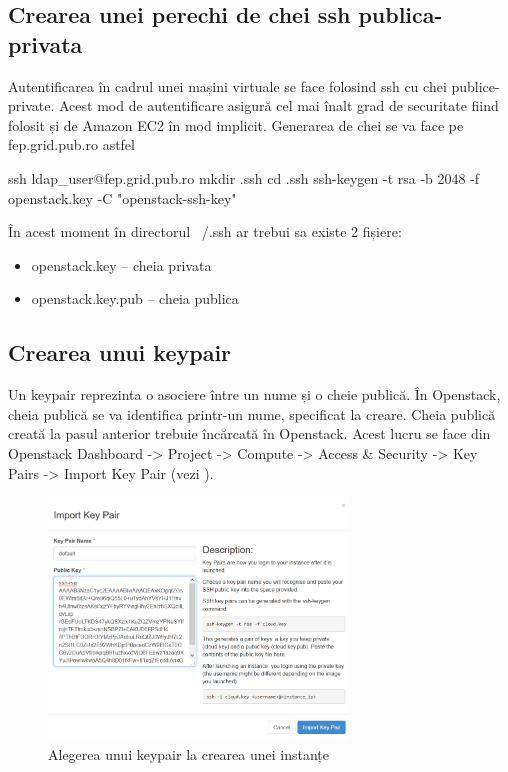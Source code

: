 \subsection{Crearea unei perechi de chei ssh publica-privata}
\label{sec:vm-openstack-keys}

Autentificarea în cadrul unei mașini virtuale se face folosind ssh cu chei
publice-private. Acest mod de autentificare asigură cel mai înalt grad de
securitate fiind folosit și de Amazon EC2 în mod implicit. Generarea de chei se
va face pe fep.grid.pub.ro astfel

\begin{screen}
ssh ldap_user@fep.grid.pub.ro
mkdir .ssh
cd .ssh
ssh-keygen -t rsa -b 2048 -f openstack.key -C "openstack-ssh-key"
\end{screen}

În acest moment în directorul ~/.ssh ar trebui sa existe 2 fișiere:

\begin{itemize}
	\item openstack.key -- cheia privata
	\item openstack.key.pub -- cheia publica
\end{itemize}

\subsection{Crearea unui keypair}
\label{sec:vm-openstack-keypares}

Un keypair reprezinta o asociere între un nume și o cheie publică. În Openstack,
cheia publică se va identifica printr-un nume, specificat la creare. Cheia
publică creată la pasul anterior trebuie încărcată în Openstack. Acest lucru se
face din Openstack Dashboard -> Project -> Compute -> Access \& Security -> Key
Pairs -> Import Key Pair (vezi ).

\begin{figure}[!htbp]
	\centering
	\includegraphics[width=8cm]{chapters/14-vm/img/openstack-keypair-img.png}
	\caption{Alegerea unui keypair la crearea unei instanțe}
	\label{fig:vm-openstack-keypair}
\end{figure}

